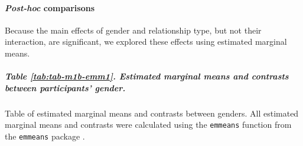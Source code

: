 \documentclass[
  bookmarksnumbered]{article}
\begin{document}
\begin{table}[H]
\centering
\caption{\label{tab:tab-m1b}Effects of relationship type and gender on Dyadic TSD Attractive Person}
\centering
{}
\end{table}

\paragraph{\texorpdfstring{\emph{Post-hoc} comparisons}{Post-hoc comparisons}}\label{post-hoc-comparisons-1}

Because the main effects of gender and relationship type, but not their interaction, are significant, we explored these effects using estimated marginal means.

\subparagraph{Table \ref{tab:tab-m1b-emm1}. Estimated marginal means and contrasts between participants' gender.}\label{table-reftabtab-m1b-emm1.-estimated-marginal-means-and-contrasts-between-participants-gender.}

Table of estimated marginal means and contrasts between genders. All estimated marginal means and contrasts were calculated using the \texttt{emmeans} function from the \texttt{emmeans} package \autocite{emmeanscit}.
\end{document}
